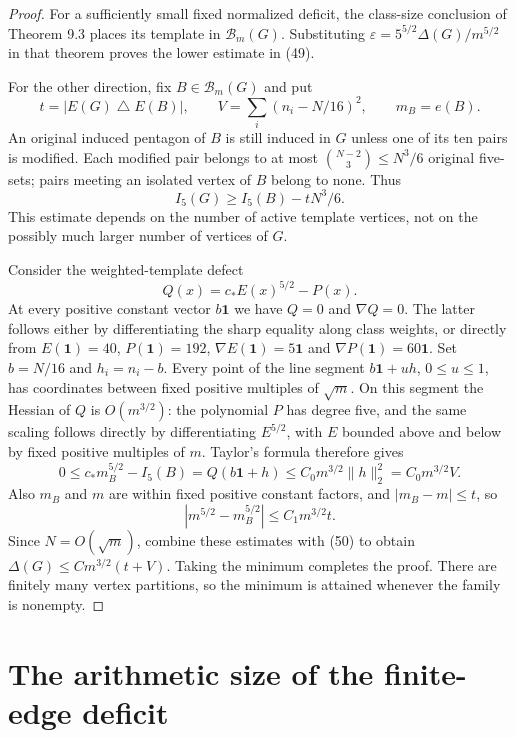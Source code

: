 \begin{proof}
For a sufficiently small fixed normalized deficit, the class-size conclusion
of Theorem 9.3 places its template in $\mathcal B_m(G)$. Substituting
$\varepsilon=5^{5/2}\Delta(G)/m^{5/2}$ in that theorem proves the lower
estimate in (49).

For the other direction, fix $B\in\mathcal B_m(G)$ and put
\[
 t=|E(G)\mathbin{\triangle}E(B)|,\qquad
 V=\sum_i(n_i-N/16)^2,\qquad m_B=e(B).
\]
An original induced pentagon of $B$ is still induced in $G$ unless one of
its ten pairs is modified. Each modified pair belongs to at most
$\binom{N-2}3\leq N^3/6$ original five-sets; pairs meeting an isolated
vertex of $B$ belong to none. Thus
\begin{equation}\tag{50}\label{eq:50}
 I_5(G)\geq I_5(B)-tN^3/6.
\end{equation}
This estimate depends on the number of active template vertices, not on the
possibly much larger number of vertices of $G$.

Consider the weighted-template defect
\[
 Q(x)=c_\ast E(x)^{5/2}-P(x).
\]
At every positive constant vector $b\mathbf1$ we have $Q=0$ and
$\nabla Q=0$. The latter follows either by differentiating the sharp equality
along class weights, or directly from $E(\mathbf1)=40$, $P(\mathbf1)=192$,
$\nabla E(\mathbf1)=5\mathbf1$ and $\nabla P(\mathbf1)=60\mathbf1$.
Set $b=N/16$ and $h_i=n_i-b$. Every point of the line segment
$b\mathbf1+uh$, $0\leq u\leq1$, has coordinates between fixed positive
multiples of $\sqrt m$. On this segment the Hessian of $Q$ is
$O(m^{3/2})$: the polynomial $P$ has degree five, and the same scaling
follows directly by differentiating $E^{5/2}$, with $E$ bounded above and
below by fixed positive multiples of $m$. Taylor's formula therefore gives
\[
 0\leq c_\ast m_B^{5/2}-I_5(B)=Q(b\mathbf1+h)
 \leq C_0m^{3/2}\|h\|_2^2=C_0m^{3/2}V.
\]
Also $m_B$ and $m$ are within fixed positive constant factors, and
$|m_B-m|\leq t$, so
\[
 |m^{5/2}-m_B^{5/2}|\leq C_1m^{3/2}t.
\]
Since $N=O(\sqrt m)$, combine these estimates with (50) to obtain
$\Delta(G)\leq Cm^{3/2}(t+V)$. Taking the minimum completes the proof.
There are finitely many vertex partitions, so the minimum is attained
whenever the family is nonempty.
\end{proof}

\section{The arithmetic size of the finite-edge deficit}
\label{sec:arithmetic-size}

